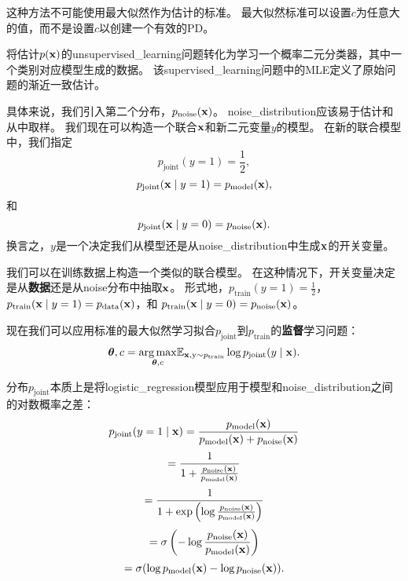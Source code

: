 这种方法不可能使用最大似然作为估计的标准。
最大似然标准可以设置$c$为任意大的值，而不是设置$c$以创建一个有效的\gls{PD}。


将估计$p(\mathbf{x})$的\gls{unsupervised_learning}问题转化为学习一个概率二元分类器，其中一个类别对应模型生成的数据。
该\gls{supervised_learning}问题中的\gls{MLE}定义了原始问题的渐近一致估计。


具体来说，我们引入第二个分布，$p_{\text{noise}}(\mathbf{x})$。
\gls{noise_distribution}应该易于估计和从中取样。
我们现在可以构造一个联合$\mathbf{x}$和新二元变量$y$的模型。
在新的联合模型中，我们指定
\begin{equation}
	p_{\text{joint}} (y = 1) = \frac{1}{2},
\end{equation}
\begin{equation}
	p_{\text{joint}} (\mathbf{x} \mid y = 1) = p_{\text{model}} (\mathbf{x}),
\end{equation}
和
\begin{equation}
	p_{\text{joint}} (\mathbf{x} \mid y = 0) = p_{\text{noise}}(\mathbf{x}).
\end{equation}
换言之，$y$是一个决定我们从模型还是从\gls{noise_distribution}中生成$\mathbf{x}$的开关变量。


我们可以在训练数据上构造一个类似的联合模型。
在这种情况下，开关变量决定是从\textbf{数据}还是从\gls{noise}分布中抽取$\mathbf{x}$。
形式地，$p_{\text{train}}(y = 1) = \frac{1}{2}$，$p_{\text{train}}( \mathbf{x} \mid y = 1) = p_{\text{data}}( \mathbf{x})$，和
$p_{\text{train}}(\mathbf{x} \mid y = 0) = p_{\text{noise}}(\mathbf{x})$。


现在我们可以应用标准的最大似然学习拟合$p_{\text{joint}}$到$p_{\text{train}}$的\textbf{监督}学习问题：
\begin{equation}
	\boldsymbol{\theta}, c = \underset{ \boldsymbol{\theta}, c}{\arg\max} \mathbb{E}_{\mathbf{x}, \mathrm{y} \sim p_{\text{train}}} \log 
	p_{\text{joint}} (y \mid \mathbf{x}).
\end{equation}


分布$p_{\text{joint}}$本质上是将\gls{logistic_regression}模型应用于模型和\gls{noise_distribution}之间的对数概率之差：
\begin{equation}
	p_{\text{joint}} (y = 1 \mid \mathbf{x}) = \frac{ p_{\text{model}}(\mathbf{x}) }{ p_{\text{model}}(\mathbf{x}) + p_{\text{noise}}(\mathbf{x}) }
\end{equation}
\begin{equation}
 = \frac{1}{1 + \frac{ p_{\text{noise}}(\mathbf{x}) }{ p_{\text{model}}(\mathbf{x}) }}
\end{equation}
\begin{equation}
= \frac{1}{1 + \exp \left( \log \frac{ p_{\text{noise}}(\mathbf{x}) }{ p_{\text{model}}(\mathbf{x}) } \right)}
\end{equation}
\begin{equation}
	= \sigma \left( - \log \frac{ p_{\text{noise}} (\mathbf{x}) }{ p_{\text{model}} (\mathbf{x}) } \right)
\end{equation}
\begin{equation}
	= \sigma ( \log p_{\text{model}} (\mathbf{x}) - \log p_{\text{noise}} (\mathbf{x})  ) .
\end{equation}


